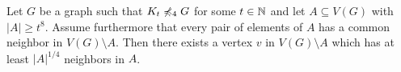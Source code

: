 \begin{lemma}[$\star$]\label{lem:diversity}
  Let $G$ be a graph such that $K_t\not\preccurlyeq_4G$ for some
  $t\in\mathbb{N}$ and let $A\subseteq V(G)$ with $|A|\geq t^{8}$. 
  Assume furthermore that every pair of elements of $A$ has a common neighbor in $V(G)\setminus A$.
  Then there exists a vertex $v$ in $V(G)\setminus A$ which has at least $|A|^{1/4}$ neighbors in $A$.
\end{lemma}
%
%
%

